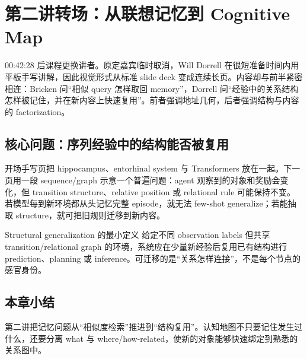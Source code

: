 \section{第二讲转场：从联想记忆到 Cognitive Map}

00:42:28 后课程更换讲者。原定嘉宾临时取消，Will Dorrell 在很短准备时间内用平板手写讲解，因此视觉形式从标准 slide deck 变成连续长页。内容却与前半紧密相连：Bricken 问“相似 query 怎样取回 memory”，Dorrell 问“经验中的关系结构怎样被记住，并在新内容上快速复用”。前者强调地址几何，后者强调结构与内容的 factorization。

\subsection{核心问题：序列经验中的结构能否被复用}

开场手写页把 hippocampus、entorhinal system 与 Transformers 放在一起。下一页用一段 sequence/graph 示意一个普遍问题：agent 观察到的对象和奖励会变化，但 transition structure、relative position 或 relational rule 可能保持不变。若模型每到新环境都从头记忆完整 episode，就无法 few-shot generalize；若能抽取 structure，就可把旧规则迁移到新内容。




\begin{importantbox}{Structural generalization 的最小定义}
给定不同 observation labels 但共享 transition/relational graph 的环境，系统应在少量新经验后复用已有结构进行 prediction、planning 或 inference。可迁移的是“关系怎样连接”，不是每个节点的感官身份。
\end{importantbox}

\subsection{本章小结}

第二讲把记忆问题从“相似度检索”推进到“结构复用”。认知地图不只要记住发生过什么，还要分离 what 与 where/how-related，使新的对象能够快速绑定到熟悉的关系图中。

